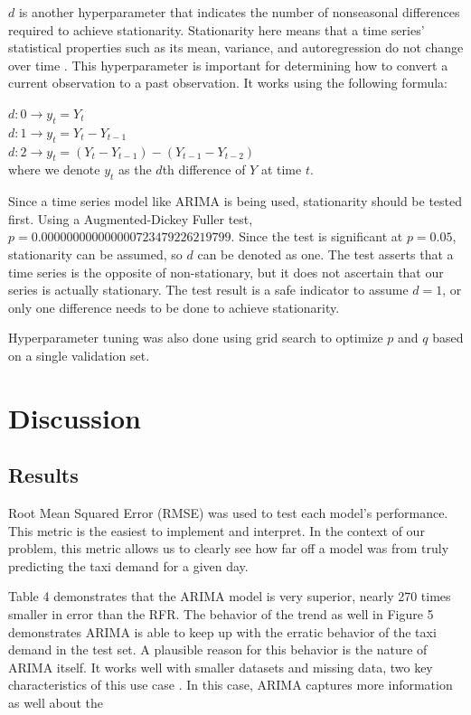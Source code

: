 \documentclass[11pt]{article}
\begin{document}
$d$ is another hyperparameter that indicates the number of nonseasonal differences required to achieve stationarity. Stationarity here means that a time series' statistical properties such as its mean, variance, and autoregression do not change over time \cite{stationarity}. This hyperparameter is important for determining how to convert a current observation to a past observation. It works using the following formula:

$d: 0 \rightarrow y_{t} = Y_{t}$  \\
$d: 1 \rightarrow y_{t} = Y_{t} - Y_{t-1}$  \\
$d: 2 \rightarrow y_{t} = (Y_{t} - Y_{t-1}) - (Y_{t-1} - Y_{t-2})$  \\

where we denote $y_{t}$ as the $d$th difference of $Y$ at time $t$.

Since a time series model like ARIMA is being used, stationarity should be tested first. Using a Augmented-Dickey Fuller test, $p = 0.000000000000000723479226219799$. Since the test is significant at $p = 0.05$, stationarity can be assumed, so $d$ can be denoted as one. The test asserts that a time series is the opposite of non-stationary, but it does not ascertain that our series is actually stationary. The test result is a safe indicator to assume $d = 1$, or only one difference needs to be done to achieve stationarity.

Hyperparameter tuning was also done using grid search to optimize $p$ and $q$ based on a single validation set.

\section{Discussion}

\subsection{Results}
Root Mean Squared Error (RMSE) was used to test each model's performance. This metric is the easiest to implement and interpret. In the context of our problem, this metric allows us to clearly see how far off a model was from truly predicting the taxi demand for a given day. 

Table 4 demonstrates that the ARIMA model is very superior, nearly 270 times smaller in error than the RFR. The behavior of the trend as well in Figure 5 demonstrates ARIMA is able to keep up with the erratic behavior of the taxi demand in the test set. A plausible reason for this behavior is the nature of ARIMA itself. It works well with smaller datasets and missing data, two key characteristics of this use case \cite{arima}. In this case, ARIMA captures more information as well about the 
\end{document}
